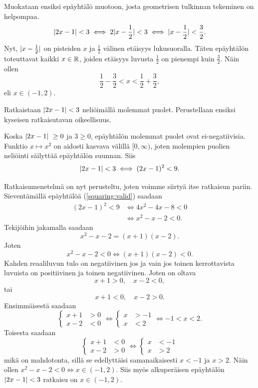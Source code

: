 \documentclass[12pt,a4paper]{article}
\begin{document}
\begin{solution}
Muokataan ensiksi epäyhtälö muotoon, josta geometrisen tulkinnan tekeminen
on helpompaa.
\[\lvert2x - 1\rvert < 3 \iff 2\lvert x - \frac{1}{2}\rvert < 3 \iff \lvert x -
\frac{1}{2}\rvert < \frac{3}{2}.\]
Nyt, \(\lvert x - \frac{1}{2}\rvert\) on pisteiden \(x\) ja \(\frac{1}{2}\) välinen
etäisyys lukusuoralla. Täten epäyhtälön toteuttavat kaikki \(x \in \mathbb{R}\), joiden
etäisyys luvusta \(\frac{1}{2}\) on pienempi kuin \(\frac{3}{2}\). Näin ollen
\[\frac{1}{2} - \frac{3}{2} < x < \frac{1}{2} + \frac{3}{2},\]
eli \(x \in (-1, 2)\).

Ratkaistaan \(\lvert2x - 1\rvert < 3\) neliöimällä molemmat puolet. Perustellaan
ensiksi kyseisen ratkaisutavan oikeellisuus.

Koska \(\lvert2x - 1\rvert\ \geq 0\) ja \(3 \geq 0\), epäyhtälön molemmat puolet
ovat ei-negatiivisia. Funktio \(x \mapsto x^2\) on aidosti kasvava välillä
\([0, \infty)\), joten molempien puolien neliöinti säilyttää epäyhtälön suunnan.
Siis
\begin{equation}\label{squaring:valid}
\lvert2x - 1\rvert < 3 \iff (2x - 1)^2 < 9.
\end{equation}

Ratkaisumenetelmä on nyt perusteltu, joten voimme siirtyä itse ratkaisun pariin.
Sieventämällä epäyhtälöä (\ref{squaring:valid}) saadaan
\begin{align*}
(2x - 1)^2 < 9 &\iff 4x^2 - 4x - 8 < 0 \\
&\iff x^2 - x - 2 < 0.
\end{align*}
Tekijöihin jakamalla saadaan
\[x^2 - x - 2 = (x + 1)(x - 2).\]
Joten
\[x^2 - x - 2 < 0 \iff (x + 1)(x - 2) < 0.\]
Kahden reaaliluvun tulo on negatiivinen jos ja vain jos toinen kerrottavista
luvuista on positiivinen ja toinen negatiivinen. Joten on oltava
\[x + 1 > 0, \quad x - 2 < 0,\]
tai
\[x + 1 < 0, \quad x - 2 > 0.\]
Ensimmäisestä saadaan
\begin{equation*}
\begin{cases}
  x + 1 &> 0 \\
  x - 2 &< 0
\end{cases}
\iff
\begin{cases}
  x &> -1 \\
  x &< 2
\end{cases}
\iff -1 < x < 2.
\end{equation*}
Toisesta saadaan
\begin{equation*}
\begin{cases}
  x + 1 &< 0 \\
  x - 2 &> 0
\end{cases}
\iff
\begin{cases}
  x &< -1 \\
  x &> 2
\end{cases}
\end{equation*}
mikä on mahdotonta, sillä se edellyttäisi samanaikaisesti
\(x < -1\) ja \(x > 2\). Näin ollen \(x^2 - x - 2 < 0 \iff x \in (-1, 2)\).
Siis myös alkuperäisen epäyhtälön \(\lvert2x - 1\rvert < 3\) ratkaisu on
\(x \in (-1, 2)\).
\end{solution}
\end{document}
